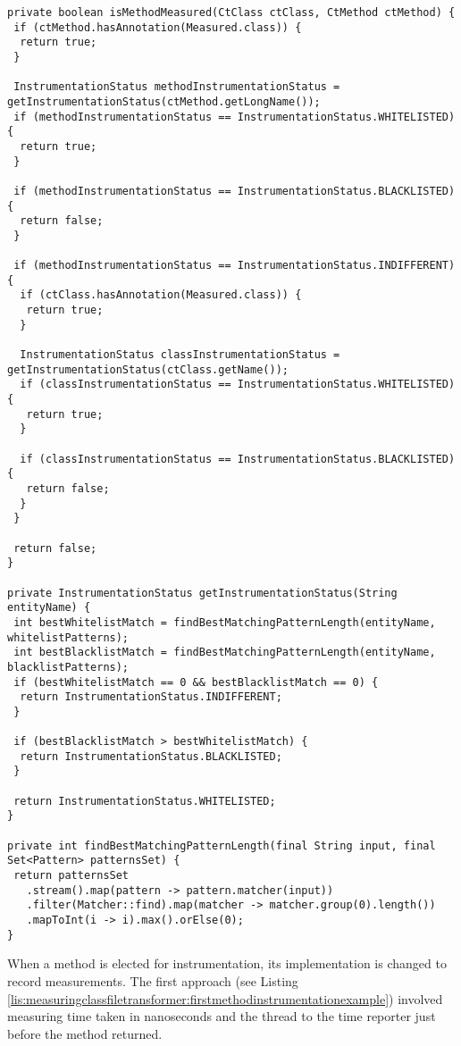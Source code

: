 \noindent\begin{minipage}[c]{\linewidth}
\begin{lstlisting}[breaklines,caption={$MeasuringClassFileTransformer.isMethodMeasured$ implementation},label=lis:measuringclassfiletransformer:ismethodmeasured]
private boolean isMethodMeasured(CtClass ctClass, CtMethod ctMethod) {
 if (ctMethod.hasAnnotation(Measured.class)) {
  return true;
 }

 InstrumentationStatus methodInstrumentationStatus = getInstrumentationStatus(ctMethod.getLongName());
 if (methodInstrumentationStatus == InstrumentationStatus.WHITELISTED) {
  return true;
 }

 if (methodInstrumentationStatus == InstrumentationStatus.BLACKLISTED) {
  return false;
 }

 if (methodInstrumentationStatus == InstrumentationStatus.INDIFFERENT) {
  if (ctClass.hasAnnotation(Measured.class)) {
   return true;
  }

  InstrumentationStatus classInstrumentationStatus = getInstrumentationStatus(ctClass.getName());
  if (classInstrumentationStatus == InstrumentationStatus.WHITELISTED) {
   return true;
  }

  if (classInstrumentationStatus == InstrumentationStatus.BLACKLISTED) {
   return false;
  }
 }
    
 return false;
}

private InstrumentationStatus getInstrumentationStatus(String entityName) {
 int bestWhitelistMatch = findBestMatchingPatternLength(entityName, whitelistPatterns);
 int bestBlacklistMatch = findBestMatchingPatternLength(entityName, blacklistPatterns);
 if (bestWhitelistMatch == 0 && bestBlacklistMatch == 0) {
  return InstrumentationStatus.INDIFFERENT;
 }

 if (bestBlacklistMatch > bestWhitelistMatch) {
  return InstrumentationStatus.BLACKLISTED;
 }

 return InstrumentationStatus.WHITELISTED;
}

private int findBestMatchingPatternLength(final String input, final Set<Pattern> patternsSet) {
 return patternsSet
   .stream().map(pattern -> pattern.matcher(input))
   .filter(Matcher::find).map(matcher -> matcher.group(0).length())
   .mapToInt(i -> i).max().orElse(0);
}
\end{lstlisting}
\end{minipage}

\noindent When a method is elected for instrumentation, its implementation is changed to record measurements. The first approach (see Listing \ref{lis:measuringclassfiletransformer:firstmethodinstrumentationexample}) involved measuring time taken in nanoseconds and the thread  to the time reporter just before the method returned.

